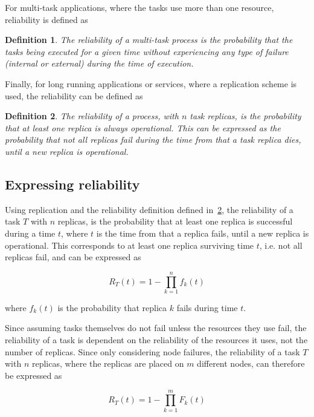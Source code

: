 \documentclass{cslthse-msc}
\newtheorem{definition}{Definition}[chapter]
\begin{document}
For multi-task applications, where the tasks use more than one resource, reliability is defined as
\begin{definition} \label{def:multi_task_reliability}
The reliability of a multi-task process is the probability that the tasks being executed for a given time without experiencing any type of failure (internal or external) during the time of execution.
\end{definition}

Finally, for long running applications or services, where a replication scheme is used, the reliability can be defined as \cite{effTaskReplMobGrid}
\begin{definition} \label{def:task_replica_reliability}
The reliability of a process, with $n$ task replicas, is the probability that at least one replica is always operational. This can be expressed as the probability that not all replicas fail during the time from that a task replica dies, until a new replica is operational.
\end{definition}

\subsection{Expressing reliability}\label{subsec:design_reliability}
Using replication and the reliability definition defined in~\cref{def:task_replica_reliability}, the reliability of a task $T$ with $n$ replicas, is the probability that at least one replica is successful during a time $t$, where $t$ is the time from that a replica fails, until a new replica is operational. This corresponds to at least one replica surviving time $t$, i.e. not all replicas fail, and can be expressed as 

\begin{equation} \label{eq:task_reliability}
R_{T}(t) = 1 - \prod\limits_{k=1}^n f_{k}(t)
\end{equation}

where $f_{k}(t)$ is the probability that replica $k$ fails during time $t$. 

Since assuming tasks themselves do not fail unless the resources they use fail, the reliability of a task is dependent on the reliability of the resources it uses, not the number of replicas. Since only considering node failures, the reliability of a task $T$ with $n$ replicas, where the replicas are placed on $m$ different nodes, can therefore be expressed as

\begin{equation} \label{eq:task_reliability_2}
R_{T}(t) = 1 - \prod\limits_{k=1}^m F_{k}(t)
\end{equation}
\end{document}
